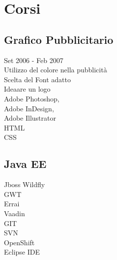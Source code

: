 \documentclass[a4paper]{deedy-resume} %
\begin{document}
\begin{minipage}[t]{0.33\textwidth}

\section{Corsi}

\subsection{Grafico Pubblicitario}
Set 2006 - Feb 2007 \\
\sectionspace %
Utilizzo del colore nella pubblicità \\
Scelta del Font adatto \\
Ideaare un logo \\
Adobe Photoshop, \\
Adobe InDesign, \\
Adobe Illustrator \\
HTML \\
CSS


\sectionspace %


\subsection{Java EE}
Jboss Wildfly \\
GWT \\
Errai \\
Vaadin \\
GIT \\
SVN \\
OpenShift \\
Eclipse IDE \\

\sectionspace %

\end{minipage} %
\hfill
%
%
\end{document}
